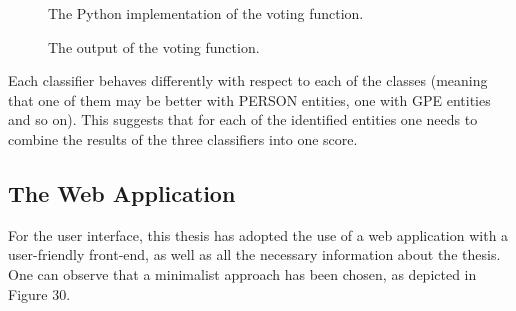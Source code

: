 \documentclass[12pt,a4paper]{article}
\begin{document}
\begin{figure}[h!]
\begin{center}
\end{center}
\caption{The Python implementation of the voting function.}
\end{figure}

\begin{figure}[h!]
\begin{center}
\end{center}
\caption{The output of the voting function.}
\end{figure}

\qquad Each classifier behaves differently with respect to each of the classes (meaning that one of them may be better with PERSON entities, one with GPE entities and so on). This suggests that for each of the identified entities one needs to combine the results of the three classifiers into one score.

\subsection{The Web Application}
\qquad \quad For the user interface, this thesis has adopted the use of a web application with a user-friendly front-end, as well as all the necessary information about the thesis. One can observe that a minimalist approach has been chosen, as depicted in Figure 30.
\end{document}
